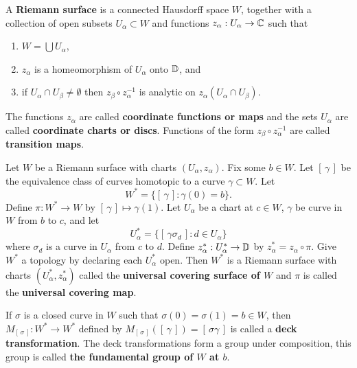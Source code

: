 \documentclass[12pt]{article}
\begin{document}
\begin{definition}
    A \textbf{Riemann surface} is a connected Hausdorff space $W$, together with a collection of open subsets $U_\alpha\subset W$ and functions $z_\alpha:U_\alpha\to \mathbb{C}$ such that
    \begin{enumerate}[label=(\roman*)]
        \item $W=\bigcup U_\alpha$,
        \item $z_\alpha$ is a homeomorphism of $U_\alpha$ onto $\mathbb{D}$, and
        \item if $U_\alpha\cap U_\beta\neq\emptyset$ then $z_\beta\circ z_\alpha^{-1}$ is analytic on $z_\alpha(U_\alpha\cap U_\beta)$.
    \end{enumerate}
    The functions $z_\alpha$ are called \textbf{coordinate functions or maps} and the sets $U_\alpha$ are called \textbf{coordinate charts or discs}. Functions of the form $z_\beta\circ z_\alpha^{-1}$ are called \textbf{transition maps}.
\end{definition}

\begin{definition}
    Let $W$ be a Riemann surface with charts $(U_\alpha,z_\alpha)$. Fix some $b\in W$. Let $[\,\gamma\,]$ be the equivalence class of curves homotopic to a curve $\gamma\subset W$. Let 
    \begin{equation*}
        W^*=\Big\{ [\,\gamma\,] : \gamma(0)=b \Big\}.
    \end{equation*}
    Define $\pi:W^*\to W$ by $[\, \gamma\, ]\mapsto \gamma(1)$. Let $U_\alpha$ be a chart at $c\in W$, $\gamma$ be curve in $W$ from $b$ to $c$, and let 
    \begin{equation*}
        U_\alpha^*=\Big\{ [\, \gamma\sigma_d\,] : d\in U_\alpha\Big\}
    \end{equation*}
    where $\sigma_d$ is a curve in $U_\alpha$ from $c$ to $d$. Define $z_\alpha^*:U_\alpha^*\to \mathbb{D}$ by $z_\alpha^*=z_\alpha\circ\pi$. Give $W^*$ a topology by declaring each $U_\alpha^*$ open. Then $W^*$ is a Riemann surface with charts $(U_\alpha^*,z_\alpha^*)$ called the \textbf{universal covering surface of $W$} and $\pi$ is called the \textbf{universal covering map}.
\end{definition}
\newpage
\begin{definition}
    If $\sigma$ is a closed curve in $W$ such that $\sigma(0)=\sigma(1)=b\in W$, then $M_{[\, \sigma\,]}:W^*\to W^*$ defined by $M_{[\, \sigma\,]}([\, \gamma \, ])=[\, \sigma\gamma\, ]$ is called a \textbf{deck transformation}. The deck transformations form a group under composition, this group is called \textbf{the fundamental group of $W$ at $b$}.
\end{definition}
\end{document}
